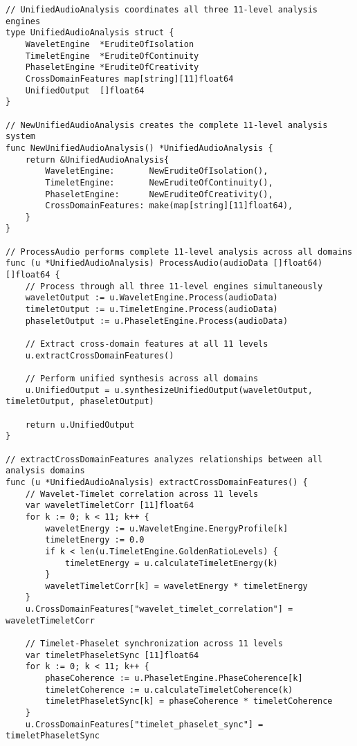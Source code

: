 \begin{tcolorbox}[colback=CodeBackground, colframe=DarkGray, title=Unified 11-Level Audio Analysis Framework, fonttitle=\bfseries]
\begin{verbatim}
// UnifiedAudioAnalysis coordinates all three 11-level analysis engines
type UnifiedAudioAnalysis struct {
    WaveletEngine  *EruditeOfIsolation
    TimeletEngine  *EruditeOfContinuity  
    PhaseletEngine *EruditeOfCreativity
    CrossDomainFeatures map[string][11]float64
    UnifiedOutput  []float64
}

// NewUnifiedAudioAnalysis creates the complete 11-level analysis system
func NewUnifiedAudioAnalysis() *UnifiedAudioAnalysis {
    return &UnifiedAudioAnalysis{
        WaveletEngine:       NewEruditeOfIsolation(),
        TimeletEngine:       NewEruditeOfContinuity(),
        PhaseletEngine:      NewEruditeOfCreativity(),
        CrossDomainFeatures: make(map[string][11]float64),
    }
}

// ProcessAudio performs complete 11-level analysis across all domains
func (u *UnifiedAudioAnalysis) ProcessAudio(audioData []float64) []float64 {
    // Process through all three 11-level engines simultaneously
    waveletOutput := u.WaveletEngine.Process(audioData)
    timeletOutput := u.TimeletEngine.Process(audioData)
    phaseletOutput := u.PhaseletEngine.Process(audioData)
    
    // Extract cross-domain features at all 11 levels
    u.extractCrossDomainFeatures()
    
    // Perform unified synthesis across all domains
    u.UnifiedOutput = u.synthesizeUnifiedOutput(waveletOutput, timeletOutput, phaseletOutput)
    
    return u.UnifiedOutput
}

// extractCrossDomainFeatures analyzes relationships between all analysis domains
func (u *UnifiedAudioAnalysis) extractCrossDomainFeatures() {
    // Wavelet-Timelet correlation across 11 levels
    var waveletTimeletCorr [11]float64
    for k := 0; k < 11; k++ {
        waveletEnergy := u.WaveletEngine.EnergyProfile[k]
        timeletEnergy := 0.0
        if k < len(u.TimeletEngine.GoldenRatioLevels) {
            timeletEnergy = u.calculateTimeletEnergy(k)
        }
        waveletTimeletCorr[k] = waveletEnergy * timeletEnergy
    }
    u.CrossDomainFeatures["wavelet_timelet_correlation"] = waveletTimeletCorr
    
    // Timelet-Phaselet synchronization across 11 levels
    var timeletPhaseletSync [11]float64
    for k := 0; k < 11; k++ {
        phaseCoherence := u.PhaseletEngine.PhaseCoherence[k]
        timeletCoherence := u.calculateTimeletCoherence(k)
        timeletPhaseletSync[k] = phaseCoherence * timeletCoherence
    }
    u.CrossDomainFeatures["timelet_phaselet_sync"] = timeletPhaseletSync
    

\end{verbatim}
\end{tcolorbox}
